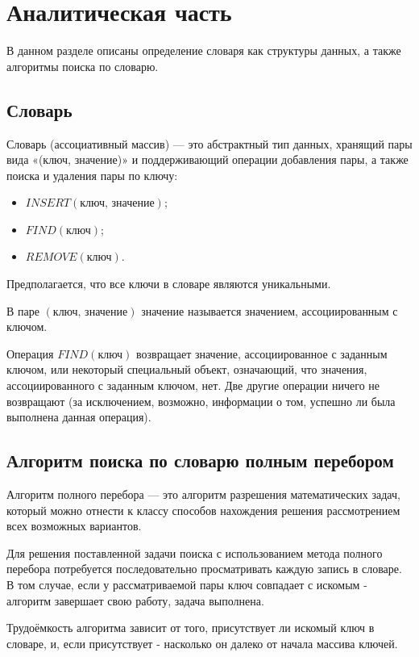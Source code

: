 \documentclass[12pt]{report}
\begin{document}
\chapter{Аналитическая часть}
В данном разделе описаны определение словаря как структуры данных, а также алгоритмы поиска по словарю.

\section{Словарь}
Словарь (ассоциативный массив)\cite{NIST} — это абстрактный тип данных, хранящий пары вида «(ключ, значение)» и поддерживающий операции добавления пары, а также поиска и удаления пары по ключу:
\begin{itemize}
\item $INSERT(\textit{ключ, значение})$;
\item $FIND(\textit{ключ})$;
\item $REMOVE(\textit{ключ})$.
\end{itemize}

Предполагается, что все ключи в словаре являются уникальными.

В паре $(\textit{ключ, значение})$ $\textit{значение}$ называется значением, ассоциированным с ключом.

Операция $FIND(\textit{ключ})$ возвращает значение, ассоциированное с заданным ключом, или некоторый специальный объект, означающий, что значения, ассоциированного с заданным ключом, нет. Две другие операции ничего не возвращают (за исключением, возможно, информации о том, успешно ли была выполнена данная операция).

\section{Алгоритм поиска по словарю полным перебором}
Алгоритм полного перебора \cite{AI} — это алгоритм разрешения математических задач, который можно отнести к классу способов нахождения решения рассмотрением всех возможных вариантов.

Для решения поставленной задачи поиска с использованием метода полного перебора потребуется последовательно просматривать каждую запись в словаре. В том случае, если у рассматриваемой пары ключ совпадает с искомым - алгоритм завершает свою работу, задача выполнена.

Трудоёмкость алгоритма зависит от того, присутствует ли искомый ключ в словаре, и, если присутствует - насколько он далеко от начала массива ключей.
\end{document}
